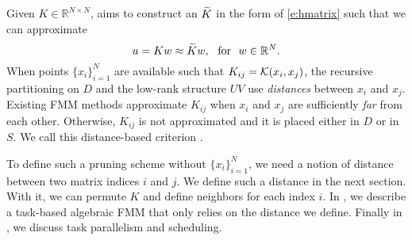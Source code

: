 
Given $K\in\mathbb{R}^{N\times N}$, \gofmm{} aims to construct an \hmatrix{}
${\widetilde{K}}$ in the form of \eqref{e:hmatrix} such that we can approximate 
\begin{equation}
  u=Kw\approx \sk{K}w,\ \mbox{~for~}\ w\in\mathbb{R}^{N}.
  \label{e:appromatvec}
\end{equation}
When points $\{x_i\}^{N}_{i=1}$ are available such that $K_{ij} = \mathcal{K}(x_i,x_j)$,
the recursive partitioning on $D$ and the low-rank structure  $UV$ use \emph{distances} between $x_i$ and $x_j$.
Existing FMM methods approximate $K_{ij}$ when $x_i$ and $x_j$ are sufficiently \emph{far} from each other.
Otherwise, $K_{ij}$ is not approximated and it is placed either in $D$ or in $S$. 
We call this distance-based criterion . 

To define such a pruning scheme without $\{x_i\}^{N}_{i=1}$,
we need a notion of distance between two matrix indices $i$ and $j$. We define such a distance in the next section.
With it, we can permute $K$ and define neighbors for each index $i$.
In , we describe a task-based algebraic FMM that only relies on the distance we define.
Finally in , we discuss task parallelism and scheduling. 



